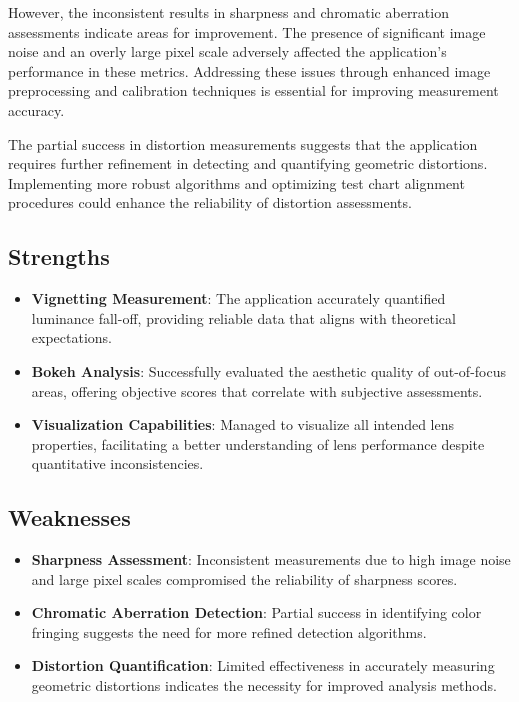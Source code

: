 However, the inconsistent results in sharpness and chromatic aberration assessments indicate areas for improvement. The presence of significant image noise and an overly large pixel scale adversely affected the application's performance in these metrics. Addressing these issues through enhanced image preprocessing and calibration techniques is essential for improving measurement accuracy.

The partial success in distortion measurements suggests that the application requires further refinement in detecting and quantifying geometric distortions. Implementing more robust algorithms and optimizing test chart alignment procedures could enhance the reliability of distortion assessments.

\subsection{Strengths}
\begin{itemize}
    \item \textbf{Vignetting Measurement}: The application accurately quantified luminance fall-off, providing reliable data that aligns with theoretical expectations.
    \item \textbf{Bokeh Analysis}: Successfully evaluated the aesthetic quality of out-of-focus areas, offering objective scores that correlate with subjective assessments.
    \item \textbf{Visualization Capabilities}: Managed to visualize all intended lens properties, facilitating a better understanding of lens performance despite quantitative inconsistencies.
\end{itemize}

\subsection{Weaknesses}
\begin{itemize}
    \item \textbf{Sharpness Assessment}: Inconsistent measurements due to high image noise and large pixel scales compromised the reliability of sharpness scores.
    \item \textbf{Chromatic Aberration Detection}: Partial success in identifying color fringing suggests the need for more refined detection algorithms.
    \item \textbf{Distortion Quantification}: Limited effectiveness in accurately measuring geometric distortions indicates the necessity for improved analysis methods.
\end{itemize}

